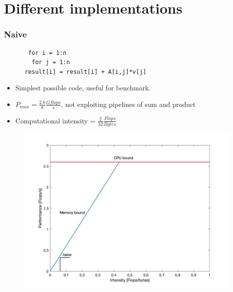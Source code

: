 \documentclass{beamer}
\begin{document}
\section{Different implementations}
\begin{frame}[fragile]
\frametitle{Naive}
\begin{center}
\begin{lstlisting}
       for i = 1:n
       	for j = 1:n 
	  result[i] = result[i] + A[i,j]*v[j]
\end{lstlisting}
\end{center}
\begin{itemize}
\item  Simplest possible code, useful for benchmark.
\item  $P_{max} = \frac{2.6}{8}\frac{Gflops}{s}$, not exploiting pipelines of sum and product
\item  Computational intensity = $\frac{2}{32}\frac{Flops}{Bytes}$
\end{itemize}
\end{frame}
\begin{frame}
\begin{figure}
\includegraphics[scale=0.25]{roof_naive}
\end{figure}
\end{frame}
\end{document}
